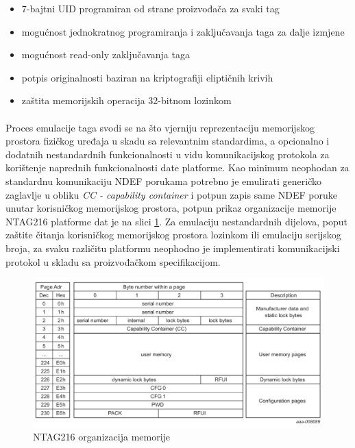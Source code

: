 \begin{itemize}[noitemsep]
    \item 7-bajtni UID programiran od strane proizvođača za svaki tag
    \item mogućnost jednokratnog programiranja i zaključavanja taga za dalje izmjene
    \item mogućnost read-only zaključavanja taga
    \item potpis originalnosti baziran na kriptografiji eliptičnih krivih
    \item zaštita memorijskih operacija 32-bitnom lozinkom
\end{itemize}

\paragraph*{}
Proces emulacije taga svodi se na što vjerniju reprezentaciju memorijskog prostora fizičkog uređaja u skadu sa relevantnim standardima, a opcionalno i dodatnih nestandardnih funkcionalnosti u vidu komunikacijskog protokola za korištenje naprednih funkcionalnosti date platforme. Kao minimum neophodan za standardnu komunikaciju NDEF porukama potrebno je emulirati generičko zaglavlje u obliku \textit{CC - capability container} i potpun zapis same NDEF poruke unutar korisničkog memorijskog prostora, potpun prikaz organizacije memorije NTAG216 platforme dat je na slici \ref{fig:ntag_mem}\cite{NTAG216}. Za emulaciju nestandardnih dijelova, poput zaštite čitanja korisničkog memorijskog prostora lozinkom ili emulaciju serijskog broja, za svaku različitu platformu neophodno je implementirati komunikacijski protokol u skladu sa proizvođačkom specifikacijom.

\begin{figure}[H]
    \centering
    \includegraphics[width=1\textwidth]{material/ntag216-memory}
    \caption{NTAG216 organizacija memorije}
    \label{fig:ntag_mem}
\end{figure}

